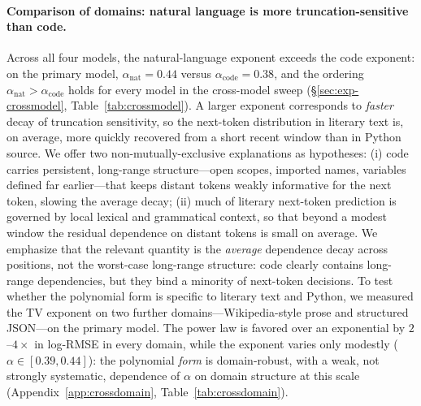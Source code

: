 \documentclass[11pt]{article}
\theoremstyle{plain}
\theoremstyle{definition}
\theoremstyle{remark}
\begin{document}
\paragraph{Comparison of domains: natural language is more truncation-sensitive than code.}
\label{sec:exp-domains}
Across all four models, the natural-language exponent exceeds the
code exponent: on the primary model, $\alpha_{\text{nat}} = 0.44$
versus $\alpha_{\text{code}} = 0.38$, and the ordering
$\alpha_{\text{nat}} > \alpha_{\text{code}}$ holds for every model in
the cross-model sweep (\S\ref{sec:exp-crossmodel},
Table~\ref{tab:crossmodel}). A larger exponent corresponds to
\emph{faster} decay of truncation sensitivity, so the next-token
distribution in literary text is, on average, more quickly
recovered from a short recent window than in Python source. We offer
two non-mutually-exclusive explanations as hypotheses:
(i) code carries persistent, long-range structure---open scopes,
imported names, variables defined far earlier---that keeps distant
tokens weakly informative for the next token, slowing the average
decay; (ii) much of literary next-token prediction is governed by
local lexical and grammatical context, so that beyond a modest
window the residual dependence on distant tokens is small on
average. We emphasize that the relevant quantity is the
\emph{average} dependence decay across positions, not the worst-case
long-range structure: code clearly contains long-range dependencies,
but they bind a minority of next-token decisions. To test whether
the polynomial form is specific to literary text and Python, we
measured the TV exponent on two further domains---Wikipedia-style
prose and structured JSON---on the primary model. The power law is
favored over an exponential by $2$--$4\times$ in log-RMSE in every
domain, while the exponent varies only modestly
($\alpha \in [0.39, 0.44]$): the polynomial \emph{form} is
domain-robust, with a weak, not strongly systematic, dependence of
$\alpha$ on domain structure at this scale
(Appendix~\ref{app:crossdomain}, Table~\ref{tab:crossdomain}).
\end{document}
